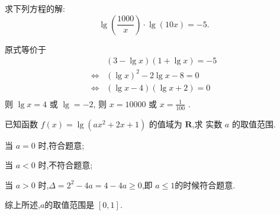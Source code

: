 \documentclass{exam-zh}
\begin{document}
        \begin{problem}[points = 10]
          求下列方程的解:
          $$
          \lg (\frac{1000}{x}) \cdot \lg (10 x) = -5.
          $$
        \end{problem}
        \begin{solution}
原式等价于
          \begin{align*}
               &(3 - \lg x)(1+\lg x ) = -5 \\
             \Leftrightarrow  & (\lg x)^2 - 2 \lg x  -8  = 0 \\
             \Leftrightarrow  & (\lg x -4)  (\lg x +2 )   = 0 \\
          \end{align*}
          则 $\lg x = 4$ 或 $\lg = -2$, 则 $x = 10000$ 或 $x = \frac{1}{100}$ .

          \vspace{3cm}

        \end{solution}











        \begin{problem}[points = 10]
          已知函数 $f(x) = \lg(ax^2 +2 x +1)$ 的值域为 $\mathbf{R}$,求 实数 $a$ 的取值范围.
        \end{problem}


        \begin{solution}
          当 $a = 0$ 时,符合题意;

          当 $a<0$ 时,不符合题意;


          当 $a>0$ 时,$\Delta = 2^2 - 4 a = 4-4a \ge 0$,即 $a \le 1$的时候符合题意.

          综上所述,$a$的取值范围是 $[0,1]$.
          
                  \end{solution}
          


 
\end{document}
